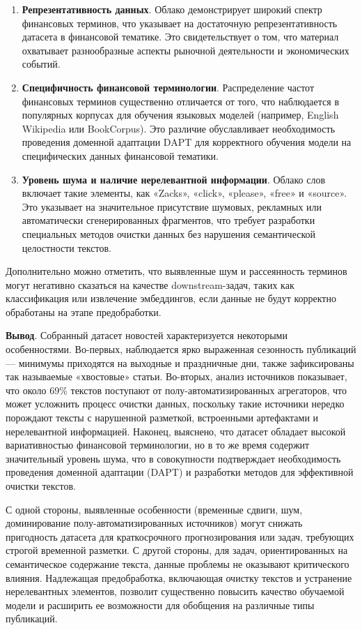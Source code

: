 \begin{enumerate}
    \item \textbf{Репрезентативность данных}. Облако демонстрирует широкий спектр финансовых терминов, что указывает на достаточную репрезентативность
    датасета в финансовой тематике. Это свидетельствует о том, что материал охватывает разнообразные аспекты рыночной деятельности и экономических событий.
    \item \textbf{Специфичность финансовой терминологии}. Распределение частот финансовых терминов существенно отличается от того,
    что наблюдается в популярных корпусах для обучения языковых моделей (например, English Wikipedia или BookCorpus).
    Это различие обуславливает необходимость проведения доменной адаптации DAPT для корректного обучения модели на специфических данных
    финансовой тематики.
    \item \textbf{Уровень шума и наличие нерелевантной информации}. Облако слов включает такие элементы, как «Zacks», «click»,
    «please», «free» и «source». Это указывает на значительное присутствие шумовых, рекламных или автоматически сгенерированных
    фрагментов, что требует разработки специальных методов очистки данных без нарушения семантической целостности текстов.
\end{enumerate}

Дополнительно можно отметить, что выявленные шум и рассеянность терминов могут негативно сказаться на качестве downstream-задач, таких как классификация
или извлечение эмбеддингов, если данные не будут корректно обработаны на этапе предобработки.

\textbf{Вывод}. Собранный датасет новостей характеризуется некоторыми особенностями. Во-первых, наблюдается ярко выраженная сезонность
публикаций --- минимумы приходятся на выходные и праздничные дни, также зафиксированы так называемые «хвостовые» статьи. Во-вторых,
анализ источников показывает, что около 69\% текстов поступают от полу-автоматизированных агрегаторов, что может усложнить процесс очистки
данных, поскольку такие источники нередко порождают тексты с нарушенной разметкой, встроенными артефактами и нерелевантной информацией.
Наконец, выяснено, что датасет обладает высокой вариативностью финансовой терминологии, но в то же время содержит значительный уровень шума,
что в совокупности подтверждает необходимость проведения доменной адаптации (DAPT) и разработки методов для эффективной очистки текстов.

С одной стороны, выявленные особенности (временные сдвиги, шум, доминирование полу-автоматизированных источников) могут
снижать пригодность датасета для краткосрочного прогнозирования или задач, требующих строгой временной разметки. С другой
стороны, для задач, ориентированных на семантическое содержание текста, данные проблемы не оказывают критического влияния.
Надлежащая предобработка, включающая очистку текстов и устранение нерелевантных элементов, позволит существенно повысить качество
обучаемой модели и расширить ее возможности для обобщения на различные типы публикаций.

